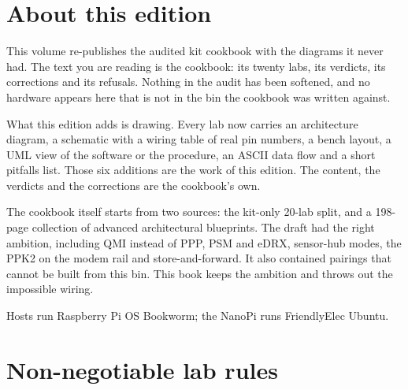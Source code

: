 \section*{About this edition}

This volume re-publishes the audited kit cookbook with the diagrams it never had. The text you are reading is the cookbook: its twenty labs, its verdicts, its corrections and its refusals. Nothing in the audit has been softened, and no hardware appears here that is not in the bin the cookbook was written against.

What this edition adds is drawing. Every lab now carries an architecture diagram, a schematic with a wiring table of real pin numbers, a bench layout, a UML view of the software or the procedure, an ASCII data flow and a short pitfalls list. Those six additions are the work of this edition. The content, the verdicts and the corrections are the cookbook's own.

The cookbook itself starts from two sources: the kit-only 20-lab split, and a 198-page collection of advanced architectural blueprints. The draft had the right ambition, including QMI instead of PPP, PSM and eDRX, sensor-hub modes, the PPK2 on the modem rail and store-and-forward. It also contained pairings that cannot be built from this bin. This book keeps the ambition and throws out the impossible wiring.

Hosts run Raspberry Pi OS Bookworm; the NanoPi runs FriendlyElec Ubuntu.


\section*{Non-negotiable lab rules}

